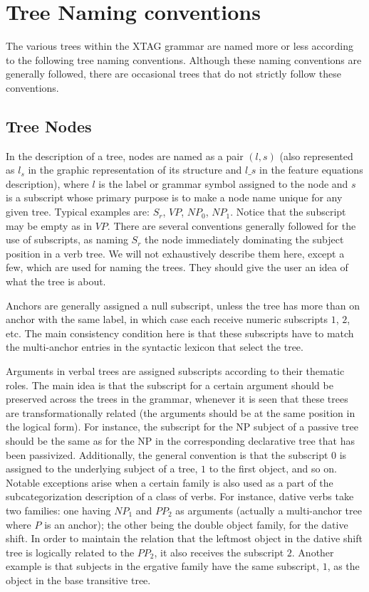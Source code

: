 \chapter{Tree Naming conventions}
\label{tree-naming}

The various trees within the XTAG grammar are named more or less according to
the following tree naming conventions.  Although these naming conventions are
generally followed, there are occasional trees that do not strictly follow
these conventions.

\section{Tree Nodes}
In the description of a tree, nodes are named as a pair $(l,s)$
(also represented as $l_s$ in the graphic representation of its structure
and $l\_s$ in the feature equations description),
where $l$ is the label or grammar symbol assigned to the node and $s$ is a 
subscript whose primary purpose is to make a node name unique for any given 
tree. Typical examples are: $S_r$, $VP$, $NP_0$, $NP_1$. Notice that the
subscript may be empty as in $VP$. 
There are several conventions generally
followed for the use of subscripts, as naming $S_r$ the node immediately 
dominating the subject position in a verb tree. 
We will not exhaustively describe them here,
except a few, which are used for naming the trees. They
should give the user an idea of what the tree is about. 

Anchors are generally assigned a null subscript, unless the tree has more than
on anchor with the same label, in which case each receive numeric 
subscripts $1$, $2$, etc. The main consistency condition here is that 
these subscripts have to match the multi-anchor entries in the syntactic 
lexicon that select the tree.
 
Arguments in verbal trees are assigned subscripts according to their 
thematic roles. The main
idea is that the subscript for a certain argument should be preserved across 
the trees in the grammar, whenever it is seen that these trees are 
transformationally related (the arguments should be at the same position in
the logical form). 
For instance, the subscript for the NP subject of
a passive tree should be the same as for the NP in the corresponding 
declarative tree that has been passivized. 
Additionally, the general convention is that the subscript $0$
is assigned to the underlying subject of a tree, $1$ to the first object,
and so on. Notable exceptions arise when a certain family is also used
as a part of the subcategorization description of a class of verbs. For
instance, dative verbs take two families: one having $NP_1$
and $PP_2$ as arguments (actually a multi-anchor tree where $P$ is an 
anchor); the other being the double object family, for the
dative shift. In order to maintain the relation that the leftmost object
in the dative shift tree is logically related to the $PP_2$, it also
receives the subscript $2$.
Another example is that
subjects in the ergative family have the 
same subscript, $1$, as the object in the base transitive tree.

